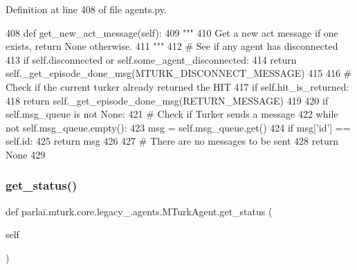 Definition at line 408 of file agents.\+py.


\begin{DoxyCode}
408     \textcolor{keyword}{def }get\_new\_act\_message(self):
409         \textcolor{stringliteral}{"""}
410 \textcolor{stringliteral}{        Get a new act message if one exists, return None otherwise.}
411 \textcolor{stringliteral}{        """}
412         \textcolor{comment}{# See if any agent has disconnected}
413         \textcolor{keywordflow}{if} self.disconnected \textcolor{keywordflow}{or} self.some\_agent\_disconnected:
414             \textcolor{keywordflow}{return} self.\_get\_episode\_done\_msg(MTURK\_DISCONNECT\_MESSAGE)
415 
416         \textcolor{comment}{# Check if the current turker already returned the HIT}
417         \textcolor{keywordflow}{if} self.hit\_is\_returned:
418             \textcolor{keywordflow}{return} self.\_get\_episode\_done\_msg(RETURN\_MESSAGE)
419 
420         \textcolor{keywordflow}{if} self.msg\_queue \textcolor{keywordflow}{is} \textcolor{keywordflow}{not} \textcolor{keywordtype}{None}:
421             \textcolor{comment}{# Check if Turker sends a message}
422             \textcolor{keywordflow}{while} \textcolor{keywordflow}{not} self.msg\_queue.empty():
423                 msg = self.msg\_queue.get()
424                 \textcolor{keywordflow}{if} msg[\textcolor{stringliteral}{'id'}] == self.id:
425                     \textcolor{keywordflow}{return} msg
426 
427         \textcolor{comment}{# There are no messages to be sent}
428         \textcolor{keywordflow}{return} \textcolor{keywordtype}{None}
429 
\end{DoxyCode}
\mbox{\label{classparlai_1_1mturk_1_1core_1_1legacy__2018_1_1agents_1_1MTurkAgent_abb7463e1f56718d7faf6829a71f7d05a}} 
\subsubsection{\texorpdfstring{get\+\_\+status()}{get\_status()}}
{\footnotesize\ttfamily def parlai.\+mturk.\+core.\+legacy\+\_.\+agents.\+M\+Turk\+Agent.\+get\+\_\+status (\begin{DoxyParamCaption}\item[{}]{self }\end{DoxyParamCaption})}

